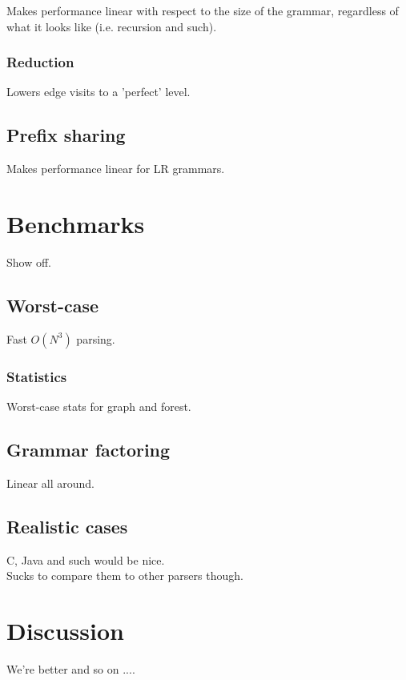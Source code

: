 \documentclass[a4paper,10pt]{article}
\begin{document}
Makes performance linear with respect to the size of the grammar, regardless of what it looks like (i.e. recursion and such).

\subsubsection{Reduction}

Lowers edge visits to a 'perfect' level.

\subsection{Prefix sharing}

Makes performance linear for LR grammars.

\section{Benchmarks}

Show off.

\subsection{Worst-case}

Fast $O(N^3)$ parsing.

\subsubsection{Statistics}

Worst-case stats for graph and forest.

\subsection{Grammar factoring}

Linear all around.

\subsection{Realistic cases}

C, Java and such would be nice.\\
Sucks to compare them to other parsers though.

\section{Discussion}

We're better and so on ....
\end{document}
